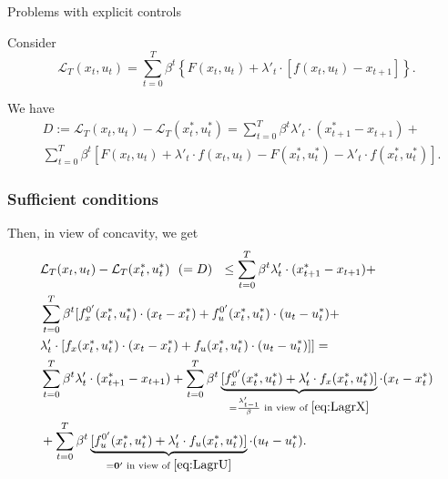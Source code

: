 \documentclass[10pt]{beamer}
\theoremstyle{definition}
\begin{document}
\begin{section}{Problems with explicit controls}
\begin{frame}[fragile]
Consider \[ \mathcal{L}_T(x_t,u_t) = \sum_{t=0}^{T}\beta^t \left\{ F(x_t,u_t) + \lambda'_t \cdot [f(x_t,u_t)-x_{t+1}] \right\} .\]

We have \begin{equation}
\begin{split}
& D := \mathcal{L}_T (x_t,u_t) - \mathcal{L}_T(x^*_t,u^*_t) = \sum_{t=0}^{T}\beta^t \lambda'_t \cdot (x^*_{t+1} - x_{t+1} )+  \\
& \sum_{t=0}^{T}\beta^t [ F(x_t,u_t) + \lambda'_t \cdot f(x_t,u_t) 
- F(x^*_t,u^*_t) - \lambda'_t \cdot f(x^*_t,u^*_t) ].
\end{split}
\label{eq:LagrDiff}
\end{equation}
\end{frame}


\begin{frame}[fragile]
\frametitle{Sufficient conditions}
Then, in view of concavity, we get \begin{equation*}
\begin{split}
&\mathcal{L}_T (x_t,u_t) - \mathcal{L}_T(x^*_t,u^*_t) ~~(= D)~~ \leq \sum_{t=0}^{T}\beta^t \lambda'_t \cdot (x^*_{t+1} - x_{t+1} )+  \\
&\sum_{t=0}^{T}\beta^t [ f^{0'}_x(x^*_t,u^*_t)\cdot(x_t-x_t^*) +f^{0'}_u(x^*_t,u^*_t)\cdot(u_t-u_t^*) +\\
& \lambda'_t \cdot [f_x(x^*_t,u^*_t)\cdot(x_t-x_t^*) + f_u(x^*_t,u^*_t)\cdot (u_t-u_t^*) ]] = \\
& \sum_{t=0}^{T}\beta^t \lambda'_t \cdot (x^*_{t+1} - x_{t+1} )+  \sum_{t=0}^{T}\beta^t \underbrace{[f^{0'}_x(x^*_t,u^*_t) + \lambda'_t \cdot f_x(x^*_t,u^*_t)]}_{=\frac{\lambda'_{t-1}}{\beta} \text{ in view of }  \eqref{eq:LagrX} }\cdot(x_t-x_t^*)\\
& + \sum_{t=0}^{T}\beta^t \underbrace{[f^{0'}_u(x^*_t,u^*_t) + \lambda'_t \cdot f_u(x^*_t,u^*_t)]}_{=\mathbf{0}' \text{ in view of } \eqref{eq:LagrU}}\cdot(u_t-u_t^*).
\end{split}
\end{equation*}
\end{frame}




\end{section}
\end{document}
